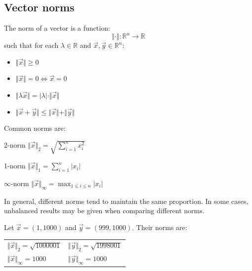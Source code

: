 \subsection{Vector norms}
The norm of a vector is a function: 
\begin{equation*}
    \Vert \cdot \Vert: \mathbb{R}^n \rightarrow \mathbb{R}
\end{equation*}
such that for each $\lambda \in \mathbb{R}$ and $\vec{x}, \vec{y} \in \mathbb{R}^n$:
\begin{itemize}
    \item $\Vert \vec{x} \Vert \geq 0$
    \item $\Vert \vec{x} \Vert = 0 \iff \vec{x} = 0$
    \item $\Vert \lambda \vec{x} \Vert = \vert \lambda \vert \cdot \Vert \vec{x} \Vert$
    \item $\Vert \vec{x} + \vec{y} \Vert \leq \Vert \vec{x} \Vert + \Vert \vec{y} \Vert$
\end{itemize}
%
Common norms are:
\begin{descriptionlist}
    \item[2-norm] $\Vert \vec{x} \Vert_2 = \sqrt{ \sum_{i=1}^{n} x_i^2 }$
    
    \item[1-norm] $\Vert \vec{x} \Vert_1 = \sum_{i=1}^{n} \vert x_i \vert$
    
    \item[$\infty$-norm] $\Vert \vec{x} \Vert_{\infty} = \max_{1 \leq i \leq n} \vert x_i \vert$
\end{descriptionlist}
%
In general, different norms tend to maintain the same proportion.
In some cases, unbalanced results may be given when comparing different norms.
\begin{example}
    Let $\vec{x} = (1, 1000)$ and $\vec{y} = (999, 1000)$. Their norms are:
    \begin{center}
        \begin{tabular}{l l}
            $\Vert \vec{x} \Vert_{2} = \sqrt{1000001}$ & $\Vert \vec{y} \Vert_{2} = \sqrt{1998001}$ \\
            $\Vert \vec{x} \Vert_{\infty} = 1000$ & $\Vert \vec{y} \Vert_{\infty} = 1000$ \\
        \end{tabular} 
    \end{center}
\end{example}


